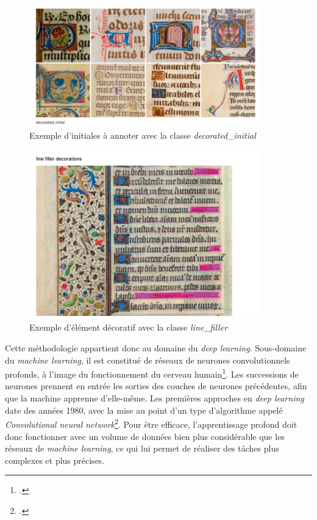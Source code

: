 \documentclass[a4paper,12pt,twoside]{book}
\begin{document}
    \begin{figure}[!h]
    \centering
    \includegraphics[width=10cm]{img/ML/decorated_initial.png}
    \caption{Exemple d'initiales à annoter avec la classe \textit{decorated\_initial}}
    \end{figure}
	
	\begin{figure}[!h]
    \centering
    \includegraphics[width=10cm]{img/ML/line_filler.png}
    \caption{Exemple d'élément décoratif avec la classe \textit{line\_filler}}
    \end{figure}
    
    Cette méthodologie appartient donc au domaine du \textit{deep learning}. Sous-domaine du \textit{machine learning}, il est constitué de réseaux de neurones convolutionnels profonds, à l'image du fonctionnement du cerveau humain\footcite[p. 68-69]{deep_convolutional_neural_networks}. Les successions de neurones prennent en entrée les sorties des couches de neurones précédentes, afin que la machine apprenne d'elle-même. Les premières approches en \textit{deep learning} date des années 1980, avec la mise au point d'un type d'algorithme appelé \textit{Convolutional neural network}\footcite[p. 1-3]{deep_convolutional_neural_networks}. Pour être efficace, l'apprentissage profond doit donc fonctionner avec un volume de données bien plus considérable que les réseaux de \textit{machine learning}, ce qui lui permet de réaliser des tâches plus complexes et plus précises.
    
\end{document}
